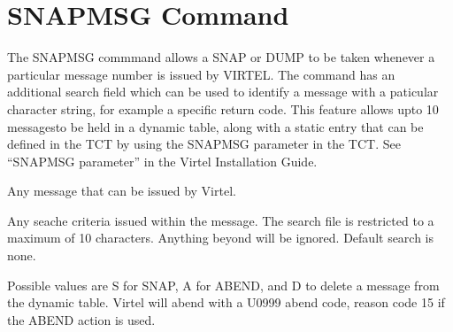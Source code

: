 \documentclass[letterpaper,10pt,english]{sphinxmanual}
\begin{document}
\ignorespaces 

\section{SNAPMSG Command}
\label{\detokenize{audit_operations_ and_performance:snapmsg-command}}\label{\detokenize{audit_operations_ and_performance:index-20}}
\begin{sphinxVerbatim}[commandchars=\\\{\}]
\PYG{p}{[}\PYG{p}{]}

                        
         
            
\end{sphinxVerbatim}

\begin{sphinxVerbatim}[commandchars=\\\{\}]
\PYG{p}{[} \PYG{p}{]}
\end{sphinxVerbatim}

\sphinxAtStartPar
The SNAPMSG commmand allows a SNAP or DUMP to be taken whenever a particular message number is issued by VIRTEL. The command has an additional search field which can be used to identify a message with a paticular character string, for example a specific return code. This feature allows upto 10 messagesto be held in a dynamic table, along with a static entry that can be defined in the TCT by using the SNAPMSG parameter in the TCT. See “SNAPMSG parameter” in the Virtel Installation Guide.
\begin{description}
\sphinxAtStartPar
Any message that can be issued by Virtel.

\sphinxAtStartPar
Any seache criteria issued within the message. The search file is restricted to a maximum of 10 characters. Anything beyond will be ignored. Default search is none.

\sphinxAtStartPar
Possible values are S for SNAP, A for ABEND, and D to delete a message from the dynamic table. Virtel will abend with a U0999 abend code, reason code 15 if the ABEND action is used.

\end{description}
\end{document}

